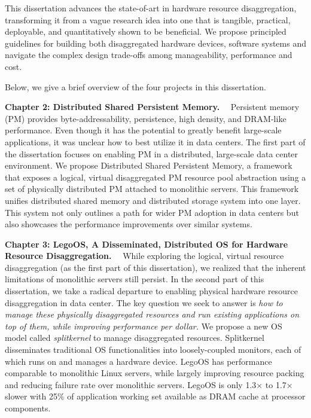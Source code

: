 \fi

This dissertation advances the state-of-art in hardware resource disaggregation,
transforming it from a vague research idea into
one that is tangible, practical, deployable, and quantitatively shown to be beneficial.
%
We propose principled guidelines for building both disaggregated hardware devices,  software systems and navigate the complex design trade-offs among manageability, performance and cost.

Below, we give a brief overview of the four projects in this dissertation.

\textbf{Chapter 2: Distributed Shared Persistent Memory.}~~
Persistent memory (PM) provides byte-addressability, persistence, high density, and DRAM-like performance.
Even though it has the potential to greatly benefit large-scale 
applications, it was unclear how to best utilize it in data centers.
%
The first part of the dissertation focuses on enabling PM in a distributed, large-scale data center environment.
%
We propose Distributed Shared Persistent Memory,
a framework that exposes a logical, virtual disaggregated PM resource pool abstraction using a set of physically distributed PM attached to monolithic servers.
This framework unifies distributed shared memory and distributed storage system into one layer.
%
This system not only outlines a path for wider PM adoption in data centers but also showcases the performance improvements over similar systems.

\textbf{Chapter 3: LegoOS, A Disseminated, Distributed OS for
Hardware Resource Disaggregation.}~~
While exploring the logical, virtual resource disaggregation (as the first part of this dissertation),
we realized that the inherent limitations of monolithic servers still persist.
In the second part of this dissertation, we take a radical departure to
enabling physical hardware resource disaggregation in data center.
%
The key question we seek to answer is \textit{how to manage these physically disaggregated resources and run existing applications on top of them, while improving performance per dollar.}
%
We propose a new OS model called \textit{splitkernel} to manage disaggregated resources.
Splitkernel disseminates traditional OS functionalities into loosely-coupled
monitors, each of which runs on and manages a hardware device.
LegoOS has performance comparable to monolithic Linux servers,
while largely improving resource packing and reducing failure rate
over monolithic servers.
LegoOS is only 1.3× to 1.7× slower with 25\% of application working set available as DRAM cache at processor components. 

